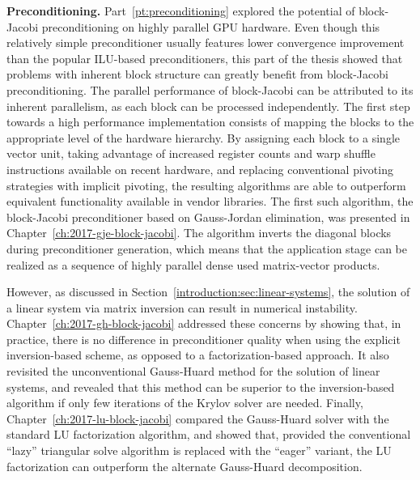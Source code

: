 \noindent\textbf{Preconditioning.}
Part~\ref{pt:preconditioning} explored the potential of block-Jacobi
preconditioning on highly parallel GPU hardware. Even though this relatively
simple preconditioner usually features lower convergence improvement than
the popular ILU-based preconditioners, this part of the thesis showed that
problems with inherent block structure can greatly benefit from block-Jacobi
preconditioning.  The parallel performance of block-Jacobi can be attributed to
its inherent parallelism, as each block can be processed independently. The
first step towards a high performance implementation consists of mapping the
blocks to the appropriate level of the hardware hierarchy. By assigning each
block to a single vector unit, taking advantage of increased register counts and
warp shuffle instructions available on recent hardware, and replacing
conventional pivoting strategies with implicit pivoting, the resulting
algorithms are able to outperform equivalent functionality available in vendor
libraries. The first such algorithm, the block-Jacobi preconditioner based on
Gauss-Jordan elimination, was presented in
Chapter~\ref{ch:2017-gje-block-jacobi}. The algorithm inverts the diagonal
blocks during preconditioner generation, which means that the application stage
can be realized as a sequence of highly parallel dense used matrix-vector
products.

However, as discussed in Section~\ref{introduction:sec:linear-systems}, the
solution of a linear system via matrix inversion can result in numerical
instability. Chapter~\ref{ch:2017-gh-block-jacobi} addressed these concerns by
showing that, in practice, there is no difference in preconditioner quality
when using the explicit inversion-based scheme, as opposed to a
factorization-based approach. It also revisited the unconventional Gauss-Huard
method for the solution of linear systems, and revealed that this method can be
superior to the inversion-based algorithm if only few iterations of the Krylov
solver are needed. Finally, Chapter~\ref{ch:2017-lu-block-jacobi} compared the
Gauss-Huard solver with the standard LU factorization algorithm, and showed
that, provided the conventional ``lazy'' triangular solve algorithm is replaced
with the ``eager'' variant, the LU factorization can outperform the alternate
Gauss-Huard decomposition.

